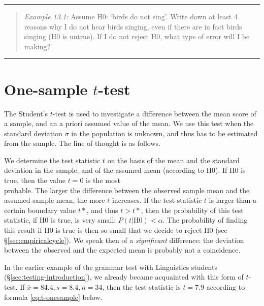 \documentclass[
]{book}
\begin{document}
\begin{center}\rule{0.5\linewidth}{0.5pt}\end{center}

\begin{quote}
\emph{Example 13.1:}
Assume H0: `birds do not sing'. Write
down at least 4 reasons why I do not hear birds singing, even
if there are in fact birds singing (H0 is untrue). If I do not reject H0,
what type of error will I be making?
\end{quote}

\begin{center}\rule{0.5\linewidth}{0.5pt}\end{center}

\hypertarget{sec:ttest-onesample}{%
\section{\texorpdfstring{One-sample \(t\)-test}{One-sample t-test}}\label{sec:ttest-onesample}}

The Student's \(t\)-test is used to investigate a difference
between the mean score of a sample, and an a priori assumed value
of the mean. We use this test when the standard deviation
\(\sigma\) in the population is unknown, and thus has to be estimated from
the sample. The line of thought is as follows.

We determine the test statistic \(t\) on the basis of the mean and the
standard deviation in the sample, and of the assumed mean (according to H0).
If H0 is true, then the value \(t=0\) is the most\\
probable. The larger the difference between the observed sample mean and the
assumed sample mean, the more \(t\) increases. If the test statistic \(t\) is larger than
a certain boundary value \(t*\), and thus \(t>t*\), then the probability of this test statistic,
if H0 is true, is very small: \(P(t|\textrm{H0}) < \alpha\). The probability of finding this result
if H0 is true is then so small that we decide to reject H0
(see §\ref{sec:empiricalcycle}). We speak then of a \emph{significant} difference:
the deviation between the observed and the expected mean is probably not a
coincidence.

In the earlier example of the grammar test with Linguistics students
(§\ref{sec:testing-introduction}), we already became acquainted with
this form of \(t\)-test.
If \(\overline{x}=84.4, s=8.4, n=34\), then the test statistic
is \(t=7.9\) according to formula \eqref{eq:t-onesample} below.
\end{document}
